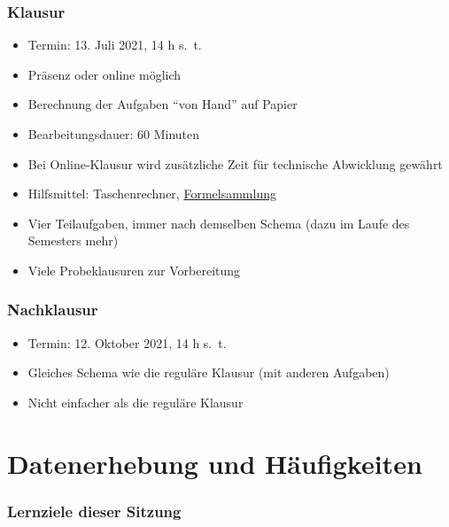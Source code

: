 \documentclass[
  11pt,
  ngerman,
  a4paper,
]{report}
\providecommand{\tightlist}{%
  \setlength{\itemsep}{0pt}\setlength{\parskip}{0pt}}
\begin{document}
\hypertarget{klausur}{%
\subsection*{Klausur}\label{klausur}}

\begin{itemize}
\tightlist
\item
  Termin: 13. Juli 2021, 14 h s.~t.
\item
  Präsenz oder online möglich
\item
  Berechnung der Aufgaben \enquote{von Hand} auf Papier
\item
  Bearbeitungsdauer: 60 Minuten
\item
  Bei Online-Klausur wird zusätzliche Zeit für technische Abwicklung gewährt
\item
  Hilfsmittel: Taschenrechner, \protect\hyperlink{formelsammlung-und-wertetabellen}{Formelsammlung}
\item
  Vier Teilaufgaben, immer nach demselben Schema (dazu im Laufe des Semesters mehr)
\item
  Viele Probeklausuren zur Vorbereitung
\end{itemize}

\hypertarget{nachklausur}{%
\subsection*{Nachklausur}\label{nachklausur}}

\begin{itemize}
\tightlist
\item
  Termin: 12. Oktober 2021, 14 h s.~t.
\item
  Gleiches Schema wie die reguläre Klausur (mit anderen Aufgaben)
\item
  Nicht einfacher als die reguläre Klausur
\end{itemize}

\hypertarget{datenerhebung-und-huxe4ufigkeiten}{%
\chapter{Datenerhebung und Häufigkeiten}\label{datenerhebung-und-huxe4ufigkeiten}}

\hypertarget{lernziele-dieser-sitzung}{%
\subsection*{Lernziele dieser Sitzung}\label{lernziele-dieser-sitzung}}
\end{document}
